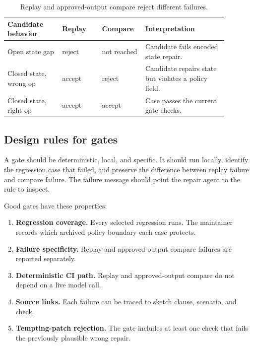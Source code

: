 \documentclass[11pt]{article}
\begin{document}
\begin{table}[t]
\begin{center}
\small
\begin{tabular}{p{0.22\linewidth}p{0.16\linewidth}p{0.17\linewidth}p{0.33\linewidth}}
\toprule
Candidate behavior & Replay & Compare & Interpretation \\
\midrule
Open state gap & reject & not reached & Candidate fails encoded state repair. \\
Closed state, wrong op & accept & reject & Candidate repairs state but violates a policy field. \\
Closed state, right op & accept & accept & Case passes the current gate checks. \\
\bottomrule
\end{tabular}
\end{center}
\caption{Replay and approved-output compare reject different failures.}
\label{tab:gate-matrix}
\end{table}

\subsection{Design rules for gates}

A gate should be deterministic, local, and specific.  It should run locally, identify the
regression case that failed, and preserve the difference between replay failure and compare
failure.  The failure message should point the repair agent to the rule to inspect.

Good gates have these properties:

\begin{enumerate}
  \item \textbf{Regression coverage.}  Every selected regression runs.  The maintainer records
        which archived policy boundary each case protects.
  \item \textbf{Failure specificity.}  Replay and approved-output compare failures are reported separately.
  \item \textbf{Deterministic CI path.}  Replay and approved-output compare do not depend on a
        live model call.
  \item \textbf{Source links.}  Each failure can be traced to sketch clause, scenario, and check.
  \item \textbf{Tempting-patch rejection.}  The gate includes at least one check that fails the
        previously plausible wrong repair.
\end{enumerate}
\end{document}
